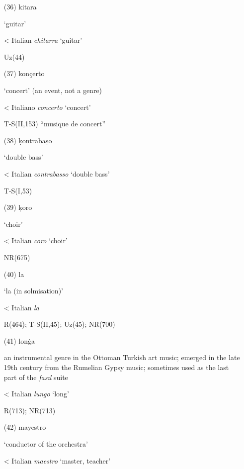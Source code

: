 \documentclass[output=paper,colorlinks,citecolor=brown,arabicfont,chinesefont]{langscibook}
\begin{document}
\begin{itemize}
    ‘clarinet’

    < Italian \emph{clarinetto} [?]

    Uz(43)\footnote{It is possible that K. Uz made a spelling mistake here. According to H.G. Farmer a different spelling of this term: {} [ḳırnaṭa] was used in the Ottoman Turkish sources at least since the 17th century \citet[24--25]{Farmer1936}. However, I did not find it in the dictionaries.}
    \item[(36)] kitara {}

    ‘guitar’

    < Italian \emph{chitarra} ‘guitar’

    Uz(44)
    \item[(37)] konçerto {} 

    ‘concert’ (an event, not a genre)

    < Italiano \emph{concerto} ‘concert’

    T-S(II,153) “musique de concert”
    \item[(38)] ḳontrabaṣo {} 

    ‘double bass’

    < Italian \emph{contrabasso} ‘double bass’

    T-S(I,53)
    \item[(39)] ḳoro {}

    ‘choir’

    < Italian \emph{coro} ‘choir’

    NR(675)
    \item[(40)] la {}

    ‘la (in solmisation)’ 

    < Italian \emph{la}

    R(464); T-S(II,45); Uz(45); NR(700)
    \item[(41)] lonġa {}

    an instrumental genre in the Ottoman Turkish art music; emerged in the late 19th century from the Rumelian Gypsy music; sometimes used as the last part of the \emph{fasıl} suite

    < Italian \emph{lungo} ‘long’

    R(713); NR(713)
    \item[(42)] mayestro {} 

    ‘conductor of the orchestra’

    < Italian \emph{maestro} ‘master,  teacher’


\end{itemize}
\end{document}
